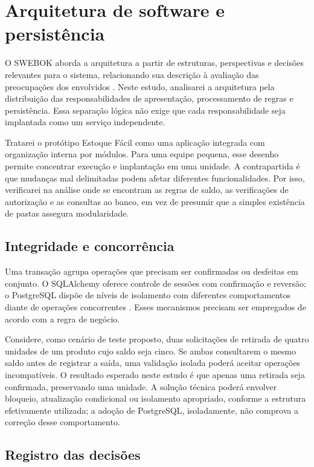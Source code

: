 \section{Arquitetura de software e persistência}

O SWEBOK aborda a arquitetura a partir de estruturas, perspectivas e decisões relevantes para o sistema, relacionando sua descrição à avaliação das preocupações dos envolvidos \cite{SWEBOK2026}. Neste estudo, analisarei a arquitetura pela distribuição das responsabilidades de apresentação, processamento de regras e persistência. Essa separação lógica não exige que cada responsabilidade seja implantada como um serviço independente.

Tratarei o protótipo Estoque Fácil como uma aplicação integrada com organização interna por módulos. Para uma equipe pequena, esse desenho permite concentrar execução e implantação em uma unidade. A contrapartida é que mudanças mal delimitadas podem afetar diferentes funcionalidades. Por isso, verificarei na análise onde se encontram as regras de saldo, as verificações de autorização e as consultas ao banco, em vez de presumir que a simples existência de pastas assegura modularidade.

\subsection{Integridade e concorrência}

Uma transação agrupa operações que precisam ser confirmadas ou desfeitas em conjunto. O SQLAlchemy oferece controle de sessões com confirmação e reversão; o PostgreSQL dispõe de níveis de isolamento com diferentes comportamentos diante de operações concorrentes \cite{SQLAlchemyDocs,PostgreSQLIsolation}. Esses mecanismos precisam ser empregados de acordo com a regra de negócio.

Considere, como cenário de teste proposto, duas solicitações de retirada de quatro unidades de um produto cujo saldo seja cinco. Se ambas consultarem o mesmo saldo antes de registrar a saída, uma validação isolada poderá aceitar operações incompatíveis. O resultado esperado neste estudo é que apenas uma retirada seja confirmada, preservando uma unidade. A solução técnica poderá envolver bloqueio, atualização condicional ou isolamento apropriado, conforme a estrutura efetivamente utilizada; a adoção de PostgreSQL, isoladamente, não comprova a correção desse comportamento.

\subsection{Registro das decisões}

